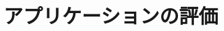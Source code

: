 \documentclass[main]{subfiles}
\begin{document}
\chapter{アプリケーションの評価}
\label{cha:evalidation}
\end{document}
